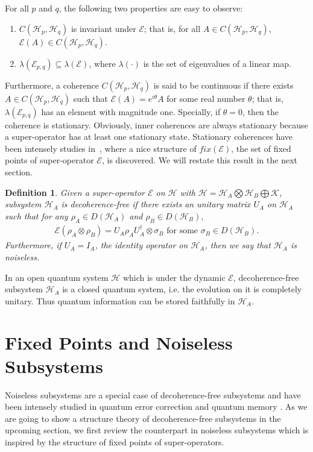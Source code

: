 \documentclass[journal]{IEEEtran}
\def\h{\ensuremath{\mathcal{H}}}
\def\k{\ensuremath{\mathcal{K}}}
\def\e{\ensuremath{\mathcal{E}}}
\def\k{\mathcal{K}}
\newtheorem{definition}{Definition}
\begin{document}
For all $p$ and $q$, the following two properties are easy to observe:
\begin{enumerate}
\item $C(\h_p,\h_q)$ is invariant under $\e$; that is, for all $A\in C(\h_p,\h_q)$, $\e(A)\in C(\h_p,\h_q)$.
\item  $\lambda(\e_{p,q})\subseteq \lambda(\e)$, where $\lambda(\cdot)$ is the set of eigenvalues of a linear map.
\end{enumerate}
Furthermore, a coherence $C(\h_p,\h_q)$ is said to be continuous  if there exists $A\in C(\h_p,\h_q)$ such that $\e(A)=e^{i\theta}A$ for some real number $\theta$; that is, $\lambda(\e_{p,q})$ has an element with magnitude one.  Specially, if $\theta=0$, then the coherence is stationary. Obviously, inner coherences are always stationary because a super-operator has at least one stationary state. Stationary coherences have been intensely studies in~\cite{baumgartner2012structure}, where a nice structure of $fix(\e)$, the set of fixed points of super-operator $\e$, is discovered. We will restate this result in the next section.
\begin{definition}\label{def_dfs}
  Given a super-operator $\e$ on $\h$ with $\h=\h_A\bigotimes \h_B\bigoplus\k$, subsystem $\h_A$ is decoherence-free if there exists an unitary matrix $U_A$ on $\h_A$ such that for any $\rho_A\in D(\h_A)$ and $\rho_B\in D(\h_B),$
  \begin{eqnarray}\label{eq_dfs_def}
    \e(\rho_A\otimes\rho_B)=U_A\rho_{A}U_A^\dagger\otimes \sigma_B \textrm{ for some } \sigma_B\in D(\h_B).
  \end{eqnarray}
  Furthermore, if $U_A=I_A$, the identity operator on $\h_A$, then we say that $\h_A$ is noiseless.  
\end{definition}

In an open quantum system $\h$ which is under the dynamic $\e$, decoherence-free subsystem $\h_A$ is a closed quantum system, i.e. the evolution on it  is completely unitary. Thus quantum information can be stored faithfully in $\h_A$.
\section{Fixed Points and Noiseless Subsystems}
Noiseless subsystems are a special case of decoherence-free subsystems and have been intensely studied in quantum error correction \cite{kribs2005operator,beny2007generalization} and quantum memory \cite{kuperberg2003capacity}. As we are going to show a structure theory of decoherence-free subsystems in the upcoming section, we first  review the counterpart in noiseless subsystems which is inspired by the structure of fixed points of super-operators. 
\end{document}
